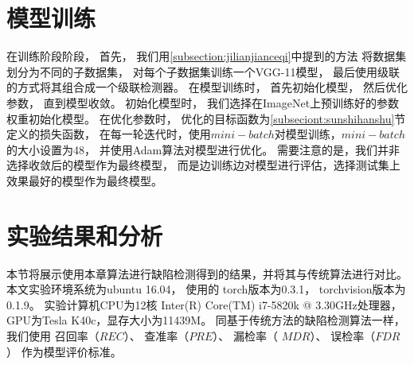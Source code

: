 \section{模型训练}

在训练阶段阶段，
首先，
我们用\ref{subsection:jilianjianceqi}中提到的方法
将数据集划分为不同的子数据集，
对每个子数据集训练一个VGG-11模型，
最后使用级联的方式将其组合成一个级联检测器。
在模型训练时，
首先初始化模型，
然后优化参数，
直到模型收敛。
初始化模型时，
我们选择在ImageNet上预训练好的参数权重初始化模型。
在优化参数时，
优化的目标函数为\ref{subseciont:sunshihanshu}节定义的损失函数，
在每一轮迭代时，使用$mini-batch$对模型训练，$mini-batch$的大小设置为48，
并使用Adam算法对模型进行优化。
需要注意的是，我们并非选择收敛后的模型作为最终模型，
而是边训练边对模型进行评估，选择测试集上效果最好的模型作为最终模型。


\section{实验结果和分析}

本节将展示使用本章算法进行缺陷检测得到的结果，并将其与传统算法进行对比。
本文实验环境系统为ubuntu 16.04，
使用的
torch版本为0.3.1，
torchvision版本为0.1.9。
实验计算机CPU为12核 Inter(R) Core(TM) i7-5820k @ 3.30GHz处理器，
GPU为Tesla K40c，显存大小为11439M。
同基于传统方法的缺陷检测算法一样，
我们使用
召回率（$REC$）、
查准率（$PRE$）、
漏检率（ $MDR$）、
误检率（$FDR$）
作为模型评价标准。


